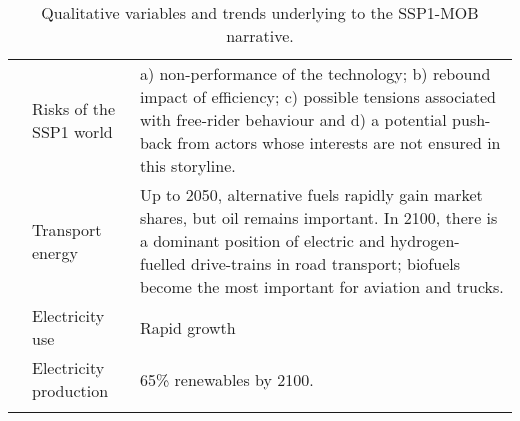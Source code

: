 {\begin{longtable}{p{3cm}p{3.5cm}p{8cm}}
\textit{} & Risks of the SSP1 world & a) non-performance of the technology; b) rebound impact of efficiency; c) possible tensions associated with free-rider behaviour and d) a potential push-back from actors whose interests are not ensured in this storyline.\\
\textit{} & Transport energy & Up to 2050, alternative fuels rapidly gain market shares, but oil remains important. In 2100, there is a dominant position of electric and hydrogen-fuelled drive-trains in road transport; biofuels become the most important for aviation and trucks.\\
\textit{} & Electricity use & Rapid growth\\
\textit{} & Electricity production & 65\% renewables by 2100.\\ \bottomrule
\caption{Qualitative variables and trends underlying to the \gls{SSP1-MOB} narrative.}
\label{t:ssp1-mob-narrative-vars}
\end{longtable}
}

\begin{infobox}
\lipsum[3]
\label{info:theories}
\end{infobox}